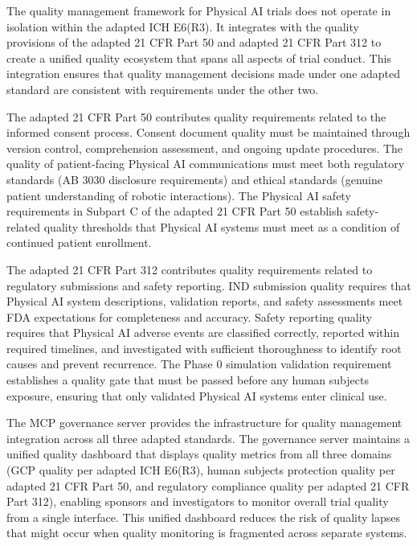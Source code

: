 The quality management framework for Physical AI trials does not operate in
isolation within the adapted ICH E6(R3). It integrates with the quality
provisions of the adapted 21 CFR Part 50 \cite{cfr50-adapt} and adapted
21 CFR Part 312 \cite{cfr312-adapt} to create a unified quality ecosystem
that spans all aspects of trial conduct. This integration ensures that
quality management decisions made under one adapted standard are consistent
with requirements under the other two.

The adapted 21 CFR Part 50 contributes quality requirements related to the
informed consent process. Consent document quality must be maintained through
version control, comprehension assessment, and ongoing update procedures.
The quality of patient-facing Physical AI communications must meet both
regulatory standards (AB 3030 disclosure requirements) and ethical standards
(genuine patient understanding of robotic interactions). The Physical AI
safety requirements in Subpart C of the adapted 21 CFR Part 50 establish
safety-related quality thresholds that Physical AI systems must meet as a
condition of continued patient enrollment.

The adapted 21 CFR Part 312 contributes quality requirements related to
regulatory submissions and safety reporting. IND submission quality requires
that Physical AI system descriptions, validation reports, and safety
assessments meet FDA expectations for completeness and accuracy. Safety
reporting quality requires that Physical AI adverse events are classified
correctly, reported within required timelines, and investigated with
sufficient thoroughness to identify root causes and prevent recurrence. The
Phase 0 simulation validation requirement establishes a quality gate that
must be passed before any human subjects exposure, ensuring that only
validated Physical AI systems enter clinical use.

The MCP governance server \cite{national-mcp-paper} provides the
infrastructure for quality management integration across all three adapted
standards. The governance server maintains a unified quality dashboard that
displays quality metrics from all three domains (GCP quality per adapted
ICH E6(R3), human subjects protection quality per adapted 21 CFR Part 50,
and regulatory compliance quality per adapted 21 CFR Part 312), enabling
sponsors and investigators to monitor overall trial quality from a single
interface. This unified dashboard reduces the risk of quality lapses that
might occur when quality monitoring is fragmented across separate systems.

